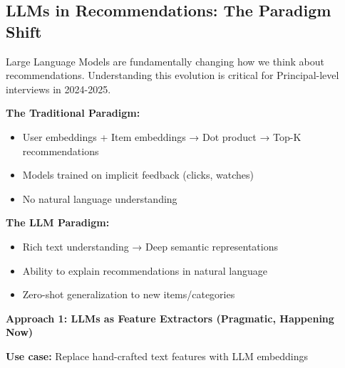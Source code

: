 \documentclass[10pt]{article}
\begin{document}
\subsection{LLMs in Recommendations: The Paradigm Shift}

Large Language Models are fundamentally changing how we think about recommendations. Understanding this evolution is critical for Principal-level interviews in 2024-2025.

\textbf{The Traditional Paradigm:}
\begin{itemize}
\item User embeddings + Item embeddings → Dot product → Top-K recommendations
\item Models trained on implicit feedback (clicks, watches)
\item No natural language understanding
\end{itemize}

\textbf{The LLM Paradigm:}
\begin{itemize}
\item Rich text understanding → Deep semantic representations
\item Ability to explain recommendations in natural language
\item Zero-shot generalization to new items/categories
\end{itemize}

\textbf{Approach 1: LLMs as Feature Extractors (Pragmatic, Happening Now)}

\textbf{Use case:} Replace hand-crafted text features with LLM embeddings
\end{document}
